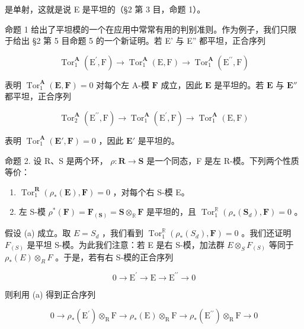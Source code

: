是单射，这就是说 E 是平坦的（§2 第 3 目，命题 1）。

命题 1 给出了平坦模的一个在应用中常常有用的判别准则。作为例子，我们只限于给出 §2 第 5 目命题 5 的一个新证明。若 E' 与 E'' 都平坦，正合序列

\[
\operatorname{Tor} _ {1} ^ {\mathbf {A}} \left(\mathrm{E} ^ {\prime}, \mathrm{F}\right)\rightarrow \operatorname{Tor} _ {1} ^ {\mathbf {A}} (\mathrm{E}, \mathrm{F}) \rightarrow \operatorname{Tor} _ {1} ^ {\mathbf {A}} \left(\mathrm{E} ^ {\prime \prime}, \mathrm{F}\right)
\]

表明 \(\operatorname{Tor}_1^{\mathbf{A}}(\mathbf{E},\mathbf{F}) = 0\) 对每个左 A-模 \(\mathbf{F}\) 成立，因此 \(\mathbf{E}\) 是平坦的。若 \(\mathbf{E}\) 与 \(\mathbf{E}''\) 都平坦，正合序列

\[
\operatorname{Tor} _ {2} ^ {\mathbf {A}} \left(\mathrm{E} ^ {\prime \prime}, \mathrm{F}\right)\rightarrow \operatorname{Tor} _ {1} ^ {\mathbf {A}} \left(\mathrm{E} ^ {\prime}, \mathrm{F}\right)\rightarrow \operatorname{Tor} _ {1} ^ {\mathbf {A}} (\mathrm{E}, \mathrm{F})
\]

表明 \(\operatorname{Tor}_1^{\mathbf{A}}(\mathbf{E}',\mathbf{F}) = 0\) ，因此 \(\mathbf{E}'\) 是平坦的。

命题 2. 设 R、S 是两个环， \(\rho: \mathbf{R} \to \mathbf{S}\) 是一个同态，F 是左 R-模。下列两个性质等价：

\begin{enumerate}
\def\labelenumi{(\alph{enumi})}
\item
  \(\operatorname{Tor}_1^{\mathbf{R}}(\rho_*(\mathbf{E}),\mathbf{F}) = 0\) ，对每个右 S-模 E。
\item
  左 S-模 \(\rho^{*}(\mathbf{F}) = \mathbf{F}_{(\mathbf{S})} = \mathbf{S} \otimes_{\mathbb{R}} \mathbf{F}\) 是平坦的，且 \(\operatorname{Tor}_{1}^{\mathbb{R}}(\rho_{*}(\mathbf{S}_{d}), \mathbf{F}) = 0\) 。
\end{enumerate}

假设 (a) 成立。取 \(E = S_{d}\) ，我们看到 \(\operatorname{Tor}_{1}^{\mathbb{R}}(\rho_{*}(S_{d}), \mathbf{F}) = 0\) 。我们还证明 \(F_{(S)}\) 是平坦 S-模。为此我们注意：若 E 是右 S-模，加法群 \(E \otimes_{S} F_{(S)}\) 等同于 \(\rho_{*}(E) \otimes_{R} F\) 。于是，若有右 S-模的正合序列

\[
0 \rightarrow \mathrm{E} ^ {\prime} \rightarrow \mathrm{E} \rightarrow \mathrm{E} ^ {\prime \prime} \rightarrow 0
\]

则利用 (a) 得到正合序列

\[
0 \rightarrow \rho_ {*} (\mathrm{E} ^ {\prime}) \otimes_ {\mathrm{R}} \mathrm{F} \rightarrow \rho_ {*} (\mathrm{E}) \otimes_ {\mathrm{R}} \mathrm{F} \rightarrow \rho_ {*} (\mathrm{E} ^ {\prime \prime}) \otimes_ {\mathrm{R}} \mathrm{F} \rightarrow 0
\]

